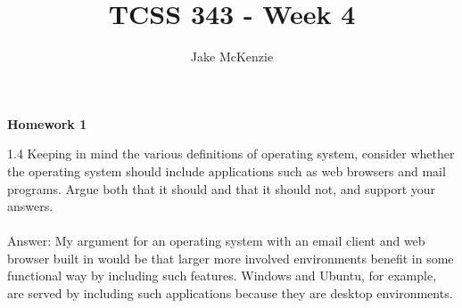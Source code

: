 \documentclass[12pt]{article}
\begin{document}
\title{TCSS 343 - Week 4}
\author{Jake McKenzie}
\maketitle
\noindent\centerline{\textbf{Homework 1}}
1.4 Keeping in mind the various definitions of operating system, consider
whether the operating system should include applications such as web
browsers and mail programs. Argue both that it should and that it
should not, and support your answers.\\\\

Answer: My argument for an operating system with an email client and web browser built in 
would be that larger more involved environments benefit in some functional 
way by including such features. Windows and Ubuntu, for example, are served by 
including such applications because they are desktop environments.  \\\\
\end{document}
